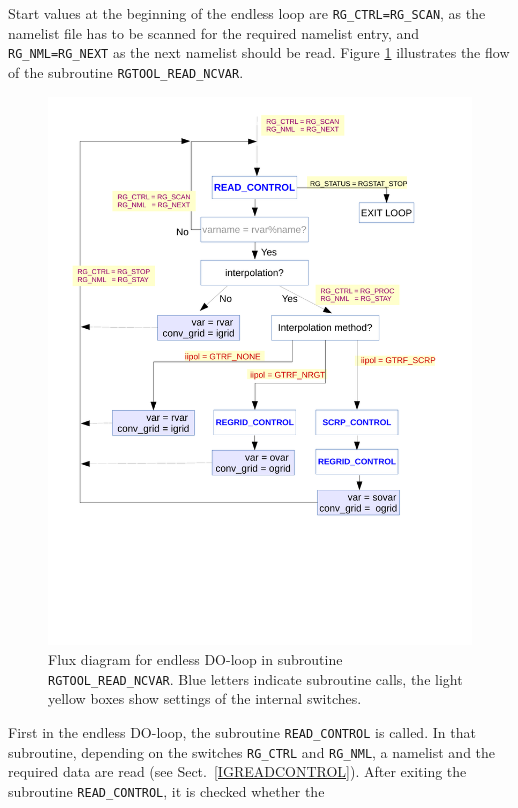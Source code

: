 \documentclass[11pt,twoside]{report}
\begin{document}
Start values at the  beginning of the endless loop
 are \verb|RG_CTRL=RG_SCAN|, 
 as the namelist file has to be scanned for the required namelist entry, and
\verb|RG_NML=RG_NEXT| as the next namelist should be read.
Figure \ref{FigREADNCVAR} illustrates the flow of the subroutine 
\verb|RGTOOL_READ_NCVAR|.
\begin{figure}
\includegraphics[width=\textwidth]{flxdiagREAD_NCVAR.pdf}
\vspace*{-4.7cm}
\caption{Flux diagram for endless DO-loop in subroutine {\tt RGTOOL\_READ\_NCVAR}. Blue letters indicate subroutine calls, the light yellow boxes show settings
of the internal switches.\label{FigREADNCVAR}}
\end{figure}
First in the endless DO-loop, the subroutine  \verb|READ_CONTROL| is called.
In that subroutine, depending on the switches  \verb|RG_CTRL| and  
\verb|RG_NML|, a namelist and the required data are read (see
Sect.~\ref{IGREADCONTROL}). 
After exiting the subroutine \verb|READ_CONTROL|, it is checked whether the
\end{document}
